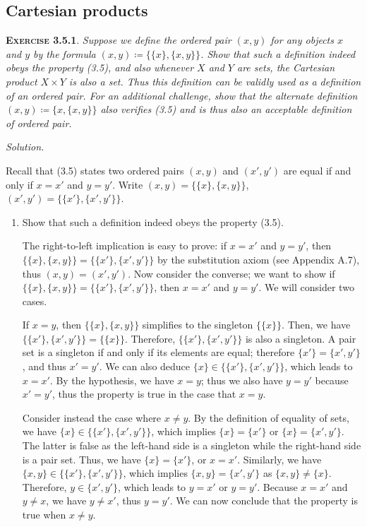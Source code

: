 \documentclass[12pt]{article}
\theoremstyle{remark}
\newenvironment{exer}[2]{
    \noindent \setlength{\parskip}{1em}%
    \textsc{\textbf{Exercise #1}}. \textit{#2} \par
    \noindent \textit{Solution.} %
}{\bigskip}
\begin{document}
\subsection{Cartesian products}
\begin{exer}{3.5.1}{
    Suppose we define the ordered pair $(x, y)$ for any objects $x$ and $y$ by the formula $(x, y) \coloneqq \{\{x\}, \{x, y\}\}$.
    Show that such a definition indeed obeys the property (3.5), and also whenever $X$ and $Y$ are sets, the Cartesian product $X \times Y$ is also a set.
    Thus this definition can be validly used as a definition of an ordered pair.
    For an additional challenge, show that the alternate definition $(x, y) \coloneqq \{x, \{x, y\}\}$ also verifies (3.5) and is thus also an acceptable definition of ordered pair.
}
    Recall that (3.5) states two ordered pairs $(x, y)$ and $(x', y')$ are equal if and only if $x = x'$ and $y = y'$.
    Write $(x, y) = \{ \{ x \}, \{ x, y \} \}$, $(x', y') = \{ \{ x' \}, \{ x', y' \} \}$.

    \begin{enumerate}[topsep=0mm,label=(\alph*)]
        \item Show that such a definition indeed obeys the property (3.5).

            The right-to-left implication is easy to prove:
            if $x = x'$ and $y = y'$, then $\{ \{ x \}, \{ x, y \} \} = \{ \{ x' \}, \{ x', y' \} \}$ by the substitution axiom (see Appendix A.7), thus $(x, y) = (x', y')$.
            Now consider the converse;
            we want to show if $\{ \{ x \}, \{ x, y \} \} = \{ \{ x' \}, \{ x', y' \}\}$, then $x = x'$ and $y = y'$.
            We will consider two cases.
            
            If $x = y$, then $\{ \{ x \}, \{ x, y \} \}$  simplifies to the singleton $\{\{ x \}\}$.
            Then, we have $\{ \{ x' \}, \{ x', y' \}\} = \{\{ x \}\}$.
            Therefore, $\{ \{ x' \}, \{ x', y' \}\}$ is also a singleton.
            A pair set is a singleton if and only if its elements are equal; therefore $\{ x' \} = \{ x', y' \}$, and thus $x' = y'$.
            We can also deduce $\{ x \} \in \{ \{ x' \}, \{ x', y' \}\}$, which leads to $x = x'$.
            By the hypothesis, we have $x = y$; thus we also have $y = y'$ because $x' = y'$, thus the property is true in the case that $x = y$.

            Consider instead the case where $x \ne y$.
            By the definition of equality of sets, we have $\{ x \} \in \{ \{ x' \}, \{ x', y' \}\}$, which implies $\{ x \} = \{ x' \}$ or $\{ x \} = \{ x', y' \}$.
            The latter is false as the left-hand side is a singleton while the right-hand side is a pair set.
            Thus, we have $\{ x \} = \{ x' \}$, or $x = x'$.
            Similarly, we have $\{ x, y \} \in \{ \{ x' \}, \{ x', y' \}\}$, which implies $\{ x, y \} = \{ x', y' \}$ as $\{ x, y \} \ne \{ x \}$.
            Therefore, $y \in \{ x', y'\}$, which leads to $y = x'$ or $y = y'$.
            Because $x = x'$ and $y \ne x$, we have $y \ne x'$, thus $y = y'$.
            We can now conclude that the property is true when $x \ne y$.
        

\end{enumerate}
\end{exer}
\end{document}
